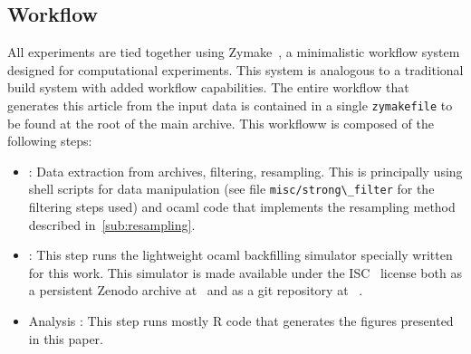 \documentclass[sigconf]{acmart}
\begin{document}
 \subsection{Workflow}

 All experiments are tied together using Zymake~\cite{zymake}, a minimalistic
 workflow system designed for computational experiments. This system is
 analogous to a traditional build system with added workflow capabilities. The
 entire workflow that generates this article from the input data is contained
 in a single \lstinline[basicstyle=\ttfamily\color{blue}]|zymakefile| to be
 found at the root of the main archive. This workfloww is composed of the
 following steps:

 \begin{itemize}

   \item[Preprocessing]: Data extraction from archives, filtering, resampling.
     This is principally using shell scripts for data manipulation (see file
     \lstinline[basicstyle=\ttfamily\color{blue}]|misc/strong\_filter| for the
     filtering steps used) and ocaml code that implements the resampling method
     described in~\ref{sub:resampling}.

   \item[Simulation]: This step runs the lightweight ocaml backfilling
     simulator specially written for this work. This simulator is made
     available under the ISC~\cite{ISC} license both as a persistent Zenodo
     archive at~\cite{ocst} and as a git repository at ~\cite{ocstgit}.

   \item[Analysis]: This step runs mostly R code that generates the figures
     presented in this paper.
 \end{itemize}
\end{document}
